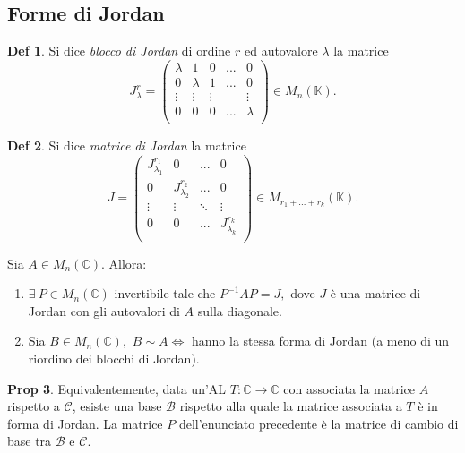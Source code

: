 \documentclass[]{article}
\theoremstyle{definition}
\theoremstyle{definition}
\newtheorem{prop}{Prop}[subsection]
\theoremstyle{definition}
\newtheorem{dfn}[prop]{Def}
\begin{document}
\subsection{Forme di Jordan}

\begin{dfn} Si dice \emph{blocco di Jordan} di ordine $r$ ed autovalore $\lambda$ la matrice 
$$J_{\lambda} ^r = 
\begin{pmatrix}
	\lambda 	& 1			& 0			& ...		& 	0		\\
	0			& \lambda 	& 1			& ... 		& 	0		\\
	\vdots		& \vdots 	& \vdots	& 		 	& \vdots	\\
	0			& 0		 	& 0			& ... 		& \lambda	\\
\end{pmatrix} \in M_n (\mathbb{K}).$$

\end{dfn} \begin{dfn} Si dice \emph{matrice di Jordan} la matrice 
$$J= \begin{pmatrix}
	J ^{r_1} _{\lambda _1}	& 0							& ...		& 0							\\
	0						& J ^{r_2} _{\lambda _2}	& ...		& 0							\\
	\vdots					& \vdots					& \ddots	& \vdots					\\
	0						& 0							& ...		& J ^{r_k} _{\lambda _k}	\\
\end{pmatrix} \in M_{r_1 + ... + r_k}(\mathbb{K}). $$
\end{dfn}

\begin{thm}
Sia $A\in M_n(\mathbb{C})$. Allora:
\begin{enumerate}
	\item $\exists\ P \in M_n(\mathbb{C})$ invertibile tale che $P^{-1}AP=J,$ dove $J$ è una matrice di Jordan con gli autovalori di $A$ sulla diagonale.
	\item Sia $B\in M_n(\mathbb{C}),$ $B \sim A \Leftrightarrow$ hanno la stessa forma di Jordan (a meno di un riordino dei blocchi di Jordan).
\end{enumerate}
\end{thm}

\begin{prop}
Equivalentemente, data un'AL $T:\mathbb{C}\to \mathbb{C}$ con associata la matrice $A$ rispetto a $\mathcal{C}$, esiste una base $\mathcal{B}$ rispetto alla quale la matrice associata a $T$ è in forma di Jordan. La matrice $P$ dell'enunciato precedente è la matrice di cambio di base tra $\mathcal{B}$ e $\mathcal{C}$.
\end{prop}
\end{document}
